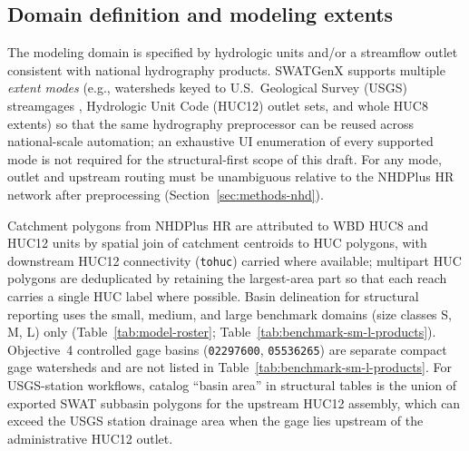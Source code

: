\subsection{Domain definition and modeling extents}
\label{sec:methods-domain}

The modeling domain is specified by hydrologic units and/or a streamflow outlet consistent with national hydrography products.
SWATGenX supports multiple \emph{extent modes} (e.g., watersheds keyed to U.S.\ Geological Survey (USGS) streamgages \citep{USGSNWIS}, Hydrologic Unit Code (HUC12) outlet sets, and whole HUC8 extents) so that the same hydrography preprocessor can be reused across national-scale automation; an exhaustive UI enumeration of every supported mode is not required for the structural-first scope of this draft.
For any mode, outlet and upstream routing must be unambiguous relative to the NHDPlus HR network after preprocessing (Section~\ref{sec:methods-nhd}).

Catchment polygons from NHDPlus HR are attributed to WBD HUC8 and HUC12 units by spatial join of catchment centroids to HUC polygons, with downstream HUC12 connectivity (\texttt{tohuc}) carried where available; multipart HUC polygons are deduplicated by retaining the largest-area part so that each reach carries a single HUC label where possible.
Basin delineation for structural reporting uses the small, medium, and large benchmark domains (size classes S, M, L) only (Table~\ref{tab:model-roster}; Table~\ref{tab:benchmark-sm-l-products}).
Objective~4 controlled gage basins (\texttt{02297600}, \texttt{05536265}) are separate compact gage watersheds and are not listed in Table~\ref{tab:benchmark-sm-l-products}.
For USGS-station workflows, catalog ``basin area'' in structural tables is the union of exported SWAT subbasin polygons for the upstream HUC12 assembly, which can exceed the USGS station drainage area when the gage lies upstream of the administrative HUC12 outlet.


